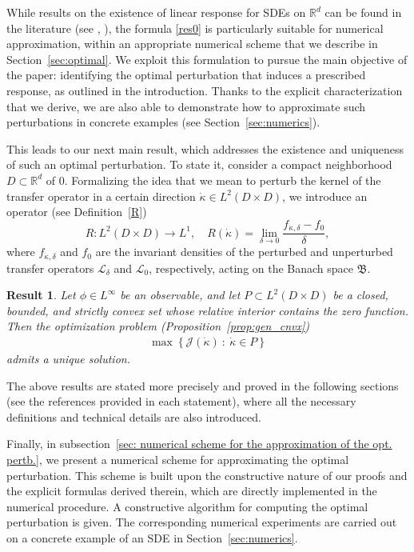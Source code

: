 \documentclass{amsart}
\newtheorem{maintheorem}{Result}
\newcommand\cL{{\mathcal L}}
\newcommand\bR{{\mathbb R}}
\newcommand\fB{{\mathfrak B}}
\begin{document}
While results on the existence of linear response for SDEs on $\mathbb{R}^d$ can be found in the literature (see \cite{HM10}, \cite{CKB22}), the formula \eqref{res0} is particularly suitable for numerical approximation, within an appropriate numerical scheme that we describe in Section~\ref{sec:optimal}. We exploit this formulation to pursue the main objective of the paper: identifying the optimal perturbation that induces a prescribed response, as outlined in the introduction. Thanks to the explicit characterization that we derive, we are also able to demonstrate how to approximate such perturbations in concrete examples (see Section~\ref{sec:numerics}).




This leads to our next main result, which addresses the existence and uniqueness of such an optimal perturbation. 
To state it, consider a compact neighborhood \(D\subset  \bR^d\) of $0$. Formalizing the idea that we mean to perturb the kernel of the transfer operator in a certain direction $\dot \kappa \in L^2(D\times D)$, we introduce an operator (see Definition~\ref{R}) 
$$
R: L^2(D\times D) \to L^1, \quad R(\dot \kappa) = \lim\limits_{\delta\to 0}\frac{f_{\dot \kappa,\delta} - f_0}{\delta},
$$
where $f_{\dot \kappa,\delta}$ and $ f_0$ are the invariant densities of the perturbed and unperturbed transfer operators \(\cL_\delta\) and \(\cL_0\), respectively, acting on the Banach space \(\fB\). 

\begin{maintheorem}
Let $\phi \in L^\infty $ be an observable, and let $P \subset L^2(D \times D)$ be a closed, bounded, and strictly convex set whose relative interior contains the zero function. Then the optimization problem (Proposition~\ref{prop:gen_cnvx})
     \begin{eqnarray} 
     \max \left \lbrace \mathcal{J}(\dot{\kappa})\ : \   \dot{\kappa} \in P\right \rbrace 
\end{eqnarray}
admits a unique solution.
\end{maintheorem}



The above results are stated more precisely and proved in the following sections (see the references provided in each statement), where all the necessary definitions and technical details are also introduced.

Finally, in subsection~\ref{sec: numerical scheme for the approximation of the opt. pertb.}, we present a numerical scheme for approximating the optimal perturbation. This scheme is built upon the constructive nature of our proofs and the explicit formulas derived therein, which are directly implemented in the numerical procedure. A constructive algorithm for computing the optimal perturbation is given. The corresponding numerical experiments are carried out on a concrete example of an SDE in Section~\ref{sec:numerics}.
\end{document}
